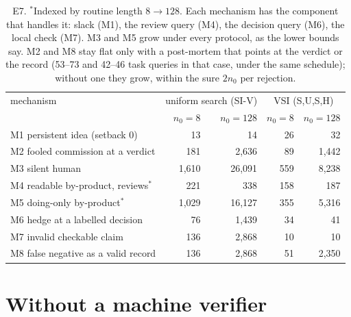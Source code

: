 \documentclass[11pt]{article}
\theoremstyle{definition}
\theoremstyle{remark}
\begin{document}
\begin{table}[h]
\centering\small
\begin{tabular}{@{}lrrrr@{}}
\toprule
mechanism & \multicolumn{2}{c}{uniform search (SI-V)} & \multicolumn{2}{c}{VSI (S,U,S,H)} \\
 & $n_0=8$ & $n_0=128$ & $n_0=8$ & $n_0=128$ \\
\midrule
M1 persistent idea (setback 0) & 13 & 14 & 26 & 32 \\
M2 fooled commission at a verdict & 181 & 2{,}636 & 89 & 1{,}442 \\
M3 silent human & 1{,}610 & 26{,}091 & 559 & 8{,}238 \\
M4 readable by-product, reviews$^*$ & 221 & 338 & 158 & 187 \\
M5 doing-only by-product$^*$ & 1{,}029 & 16{,}127 & 355 & 5{,}316 \\
M6 hedge at a labelled decision & 76 & 1{,}439 & 34 & 41 \\
M7 invalid checkable claim & 136 & 2{,}868 & 10 & 10 \\
M8 false negative as a valid record & 136 & 2{,}868 & 51 & 2{,}350 \\
\bottomrule
\end{tabular}
\caption{E7. $^*$Indexed by routine length $8\to128$. Each mechanism has the component that handles it: slack (M1), the review query (M4), the decision query (M6), the local check (M7). M3 and M5 grow under every protocol, as the lower bounds say. M2 and M8 stay flat only with a post-mortem that points at the verdict or the record (53--73 and 42--46 task queries in that case, under the same schedule); without one they grow, within the sure $2n_0$ per rejection.}
\label{tab:e7}
\end{table}

\section{Without a machine verifier}\label{sec:nonformal}
\end{document}
